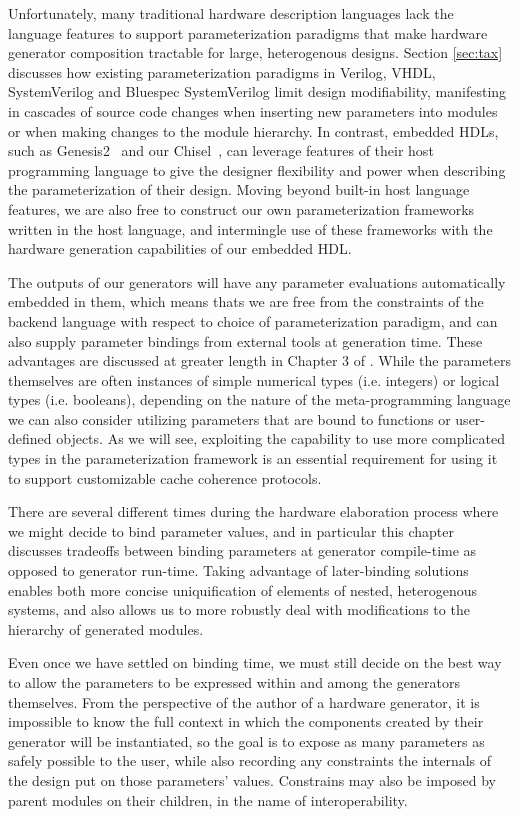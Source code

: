 Unfortunately, many traditional hardware description languages lack the language features to support parameterization paradigms that make hardware generator composition tractable for large, heterogenous designs.
Section \ref{sec:tax} discusses how existing parameterization paradigms in Verilog, VHDL, SystemVerilog and Bluespec SystemVerilog limit design modifiability, manifesting in cascades of source code changes when inserting new parameters into modules or when making changes to the module hierarchy.
In contrast, embedded HDLs, such as Genesis2~\cite{genesis2} and our Chisel~\cite{chisel}, can leverage features of their host programming language to give the designer flexibility and power when describing the parameterization of their design.
Moving beyond built-in host language features, we are also free to construct our own parameterization frameworks written in the host language, and intermingle use of these frameworks with the hardware generation capabilities of our embedded HDL.

The outputs of our generators will have any parameter evaluations automatically embedded in them,
which means thats we are free from the constraints of the backend language with respect to choice of parameterization paradigm,
and can also supply parameter bindings from external tools at generation time.
These advantages are discussed at greater length in Chapter 3 of \cite{shacham2011chip}.
While the parameters themselves are often instances of simple numerical types (i.e. integers) or logical types (i.e. booleans), depending on the nature of the meta-programming language we can also consider utilizing parameters that are bound to functions or user-defined objects.
As we will see, exploiting the capability to use more complicated types in the parameterization framework
is an essential requirement for using it to support customizable cache coherence protocols.

There are several different times during the hardware elaboration process where we might decide to bind parameter values, and in particular this chapter discusses tradeoffs between
binding parameters at generator compile-time as opposed to generator run-time.
Taking advantage of later-binding solutions enables both more concise uniquification of elements of nested, heterogenous systems,
and also allows us to more robustly deal with modifications to the hierarchy of generated modules.

Even once we have settled on binding time, we must still decide on the best way to allow the parameters to be expressed within and among the generators themselves.
From the perspective of the author of a hardware generator, it is impossible to know the full context in which the components created by their generator will be instantiated,
so the goal is to expose as many parameters as safely possible to the user,
while also recording any constraints the internals of the design put on those parameters' values.
Constrains may also be imposed by parent modules on their children, in the name of interoperability.

